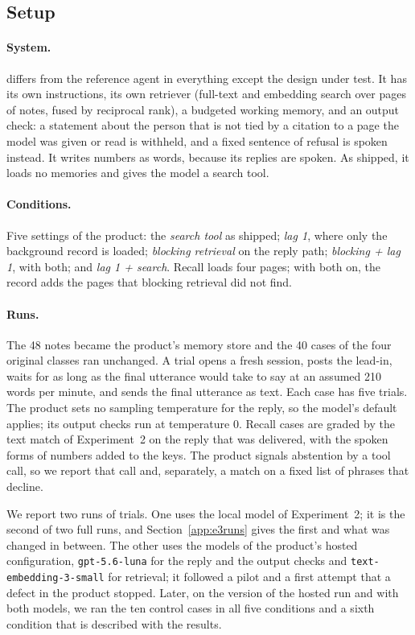 \documentclass[10pt]{article}
\begin{document}
\subsection{Setup}

\paragraph{System.} \Product{} differs from the reference agent in everything except the design under test. It has its own instructions, its own retriever (full-text and embedding search over pages of notes, fused by reciprocal rank), a budgeted working memory, and an output check: a statement about the person that is not tied by a citation to a page the model was given or read is withheld, and a fixed sentence of refusal is spoken instead. It writes numbers as words, because its replies are spoken. As shipped, it loads no memories and gives the model a search tool.

\paragraph{Conditions.} Five settings of the product: the \emph{search tool} as shipped; \emph{lag 1}, where only the background record is loaded; \emph{blocking retrieval} on the reply path; \emph{blocking + lag 1}, with both; and \emph{lag 1 + search}. Recall loads four pages; with both on, the record adds the pages that blocking retrieval did not find.

\paragraph{Runs.} The 48 notes became the product's memory store and the 40 cases of the four original classes ran unchanged. A trial opens a fresh session, posts the lead-in, waits for as long as the final utterance would take to say at an assumed 210 words per minute, and sends the final utterance as text. Each case has five trials. The product sets no sampling temperature for the reply, so the model's default applies; its output checks run at temperature 0. Recall cases are graded by the text match of Experiment~2 on the reply that was delivered, with the spoken forms of numbers added to the keys. The product signals abstention by a tool call, so we report that call and, separately, a match on a fixed list of phrases that decline.

We report two runs of \KTrials{} trials. One uses the local model of Experiment~2; it is the second of two full runs, and Section~\ref{app:e3runs} gives the first and what was changed in between. The other uses the models of the product's hosted configuration, \texttt{gpt-5.6-luna} for the reply and the output checks and \texttt{text-embedding-3-small} for retrieval; it followed a pilot and a first attempt that a defect in the product stopped. Later, on the version of the hosted run and with both models, we ran the ten control cases in all five conditions and a sixth condition that is described with the results.
\end{document}
